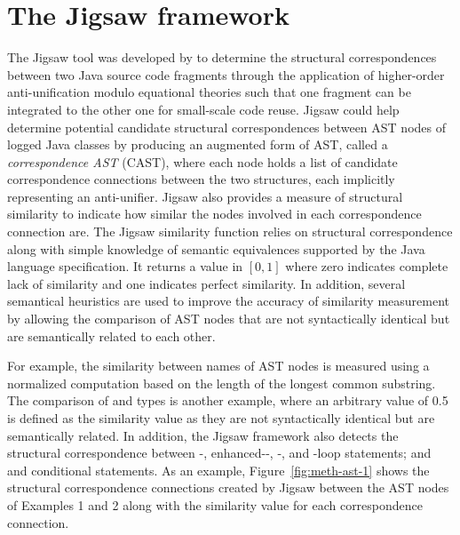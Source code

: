\section{The Jigsaw framework}\label{Jigsaw}
The Jigsaw tool was developed by \citet{2008:fse:cottrell} to determine the structural correspondences between two Java source code fragments through the application of higher-order anti-unification modulo equational theories such that one fragment can be integrated to the other one for small-scale code reuse. Jigsaw could help determine potential candidate structural correspondences between AST nodes of logged Java classes by producing an augmented form of AST, called a \emph{correspondence AST} (CAST), where each node holds a list of candidate correspondence connections between the two structures, each implicitly representing an anti-unifier. Jigsaw also provides a measure of structural similarity to indicate how similar the nodes involved in each correspondence connection are. The Jigsaw similarity function relies on structural correspondence along with simple knowledge of semantic equivalences supported by the Java language specification. It returns a value in $[0, 1]$ where zero indicates complete lack of similarity and one indicates perfect similarity. In addition, several semantical heuristics are used to improve the accuracy of similarity measurement by allowing the comparison of AST nodes that are not syntactically identical but are semantically related to each other.

For example, the similarity between names of AST nodes is measured using a normalized computation based on the length of the longest common substring. The comparison of  and  types is another example, where an arbitrary value of 0.5 is defined as the similarity value as they are not syntactically identical but are semantically related. In addition, the Jigsaw framework also detects the structural correspondence between  -, enhanced--, -, and -loop statements; and  and  conditional statements. As an example, Figure~\ref{fig:meth-ast-1} shows the structural correspondence connections created by Jigsaw between the AST nodes of Examples 1 and 2 along with the similarity value for each correspondence connection.

